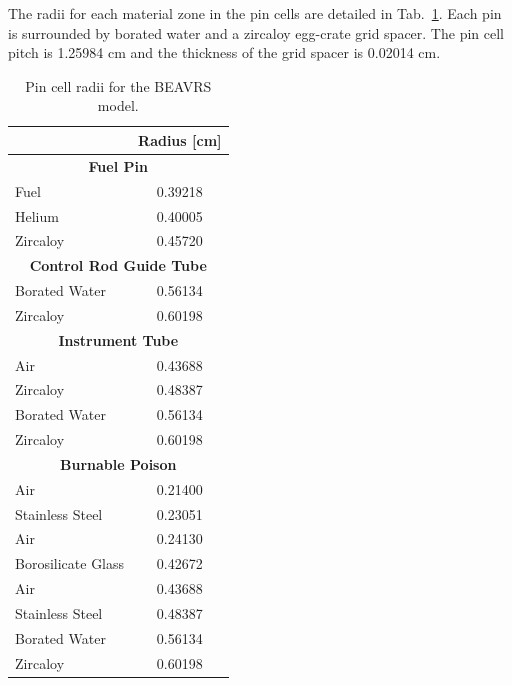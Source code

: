 The radii for each material zone in the pin cells are detailed in Tab.~\ref{table:chap7-pin-cell-radii}. Each pin is surrounded by borated water and a zircaloy egg-crate grid spacer.  The pin cell pitch is 1.25984 cm and the thickness of the grid spacer is 0.02014 cm.

\renewcommand{\arraystretch}{0.9}
\begin{table}[h!]
  \centering
  \caption[BEAVRS pin cell radii]{Pin cell radii for the \ac{BEAVRS} model.}
  \small
  \label{table:chap7-pin-cell-radii} 
  \vspace{6pt}
  \begin{tabular}{l c}
  \toprule
  \rowcolor{lightgray}
  \multicolumn{1}{c}{\bf Material} &
  \multicolumn{1}{c}{\bf Radius [cm]} \\
  \midrule
  \multicolumn{2}{c}{\bf Fuel Pin} \\
  \midrule
  Fuel &  0.39218 \\
  Helium & 0.40005 \\
  Zircaloy & 0.45720 \\
  \midrule
  \multicolumn{2}{c}{\bf Control Rod Guide Tube} \\
  \midrule
  Borated Water & 0.56134 \\
  Zircaloy & 0.60198 \\
  \midrule
  \multicolumn{2}{c}{\bf Instrument Tube} \\
  \midrule
  Air & 0.43688 \\
  Zircaloy & 0.48387 \\
  Borated Water & 0.56134 \\
  Zircaloy & 0.60198 \\
  \midrule
  \multicolumn{2}{c}{\bf Burnable Poison} \\
  \midrule
  Air & 0.21400 \\
  Stainless Steel & 0.23051 \\
  Air & 0.24130 \\
  Borosilicate Glass & 0.42672 \\
  Air & 0.43688 \\
  Stainless Steel & 0.48387 \\
  Borated Water & 0.56134 \\
  Zircaloy & 0.60198 \\
  \bottomrule
\end{tabular}
\end{table}



